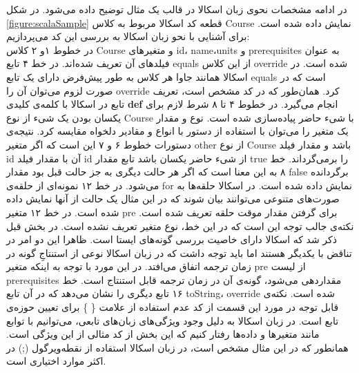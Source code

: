 در ادامه مشخصات نحوی زبان اسکالا در قالب یک مثال توضیح داده می‌شود. در شکل \ref{figure:scalaSample} قطعه کد اسکالا مربوط به کلاس Course نمایش داده شده است. برای آشنایی با نحو زبان اسکالا به بررسی این کد می‌پردازیم:\\
در خطوط ۱و ۲ کلاس Course و متغیرهای id، name،units و prerequisites به عنوان فیلد‌های آن تعریف شده‌اند. در خط ۴ تابع equals از این کلاس override شده است. در اسکالا همانند جاوا هر کلاس به طور پیش‌فرض دارای یک تابع‌ equals است که در صورت لزوم می‌توان آن را override کرد. همان‌طور که در کد مشخص است، تعریف تابع در اسکالا با کلمه‌ی کلیدی \textbf{def} انجام می‌گیرد. در خطوط ۴ تا ۸ شرط لازم برای یکسان بودن یک شیء از نوع Course با شیء حاضر پیاده‌سازی شده است. نوع و مقدار یک متغیر را می‌توان با استفاده از دستور  با انواع و مقادیر دلخواه مقایسه کرد. نتیجه‌ی دستورات خطوط ۶ و ۷ این است که اگر متغیر other از نوع Course باشد و مقدار فیلد id آن با مقدار فیلد id از شیء حاضر یکسان باشد تابع مقدار true را برمی‌گرداند. خط ۸ به این معنا است که اگر هر حالت دیگری به جز حالت قبل بود مقدار false برگردانده ‌می‌شود. در خط ۱۲ ‌نمونه‌ای از حلقه‌ی for نمایش داده شده است. در اسکالا حلقه‌ها به صورت‌های متنوعی می‌توانند بیان شوند که در این مثال یک حالت از آنها نمایش داده شده است.  در خط ۱۲ متغیر pre برای گرفتن مقدار موقت حلقه تعریف شده است. نکته‌ی جالب توجه این است که در این خط، نوع متغیر تعریف نشده است. در بخش قبل ذکر شد که اسکالا دارای خاصیت بررسی گونه‌های ایستا  است. ظاهرا این دو امر در تناقض با یکدیگر هستند اما باید توجه داشت که در زبان اسکالا نوعی از استنتاجِ گونه در زمان ترجمه اتفاق می‌افتد. در این مورد با توجه به اینکه متغیر pre از لیست prerequisites مقداردهی می‌شود، گونه‌ی آن در زمان ترجمه قابل استنتاج است. خط ۱۶ تابع دیگری را نشان می‌دهد که در آن تابع toString، override شده است. نکته‌ی قابل توجه در مورد این قسمت از کد عدم استفاده از علامت \{ \} برای تعیین حوزه‌ی تابع است. در زبان اسکالا به دلیل وجود ویژگی‌های زبان‌های تابعی، می‌توانیم با توابع مانند متغیر‌ها و داده‌ها رفتار کنیم که این بخش از کد مثالی از این ویژگی است. همانطور که در این مثال مشخص است، در زبان اسکالا استفاده از نقطه‌ویرگول (;) در اکثر موارد اختیاری است.

